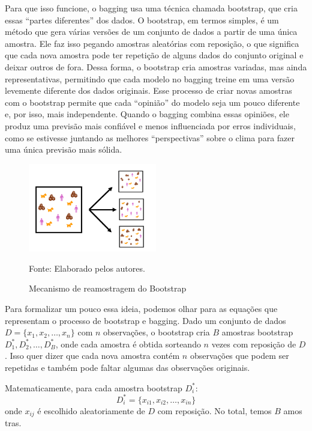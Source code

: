 \documentclass[a4paper,12pt]{article}[abntex2]
\begin{document}
Para que isso funcione, o bagging usa uma técnica chamada bootstrap, que cria essas “partes diferentes” dos dados. O bootstrap, em termos simples, é um método que gera várias versões de um conjunto de dados a partir de uma única amostra. Ele faz isso pegando amostras aleatórias com reposição, o que significa que cada nova amostra pode ter repetição de alguns dados do conjunto original e deixar outros de fora. Dessa forma, o bootstrap cria amostras variadas, mas ainda representativas, permitindo que cada modelo no bagging treine em uma versão levemente diferente dos dados originais. Esse processo de criar novas amostras com o bootstrap permite que cada “opinião” do modelo seja um pouco diferente e, por isso, mais independente. Quando o bagging combina essas opiniões, ele produz uma previsão mais confiável e menos influenciada por erros individuais, como se estivesse juntando as melhores “perspectivas” sobre o clima para fazer uma única previsão mais sólida.

\begin{figure}[H]
    \centering
    \caption{Mecanismo de reamostragem do Bootstrap} 
    \includegraphics[width=0.5\textwidth]{APS/q2_fig1.png}
    \label{q2_fig1} 
    
    \footnotesize{Fonte: Elaborado pelos autores.}
\end{figure}


Para formalizar um pouco essa ideia, podemos olhar para as equações que representam o processo de bootstrap e bagging.
Dado um conjunto de dados \( D = \{x_1, x_2, \ldots, x_n\} \) com \( n \) observações, o bootstrap cria \( B \) amostras bootstrap \( D_1^{*}, D_2^{*}, \ldots, D_B^{*} \), onde cada amostra é obtida sorteando \( n \) vezes com reposição de \( D \). Isso quer dizer que cada nova amostra contém \( n \) observações que podem ser repetidas e também pode faltar algumas das observações originais.

Matematicamente, para cada amostra bootstrap \( D_i^{*} \):
\[
D_i^{*} = \{x_{i1}, x_{i2}, \ldots, x_{in}\}
\]
onde \( x_{ij} \) é escolhido aleatoriamente de \( D \) com reposição. No total, temos \( B \) amos tras.
\end{document}
